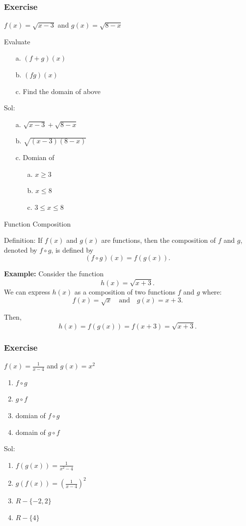 \documentclass{beamer}
\begin{document}
  \begin{frame}
    \frametitle{Exercise }
    \( f(x)  = \sqrt{x-3}\) and \(g(x) = \sqrt{8 - x }\)
    
    Evaluate
    \begin{enumerate}
      \item[a.] \((f+g)(x)\)  
      \item[b.]  \((fg)(x)\)
      \item[c.] Find the domain of above 
    \end{enumerate}
  \pause 
  Sol: 
  \begin{enumerate}
    \item[a.] \(\sqrt{x-3} + \sqrt{8-x} \) 
    \item[b.] \(\sqrt{(x-3)(8-x)} \)  
    \item[c.]  Domian of \begin{enumerate}
      \item[a.] \(x\geq 3 \)  
      \item[b.] \(x \leq 8 \)  
      \item[c.] \( 3 \leq x \leq 8 \)    
    \end{enumerate}
  \end{enumerate}
\end{frame}
  \begin{frame}{Function Composition }
    \begin{block}{Definition:}  
    If \( f(x) \) and \( g(x) \) are functions, then the composition of \( f \) and \( g \), denoted by \( f \circ g \), is defined by
    \[
      (f \circ g)(x) = f(g(x)).
    \]
    \end{block}
    \medskip
    
    \textbf{Example:}
    Consider the function
    \[
      h(x) = \sqrt{x+3}.
    \]
    We can express \( h(x) \) as a composition of two functions \( f \) and \( g \) where:
    \[
      f(x) = \sqrt{x} \quad \text{and} \quad g(x) = x+3.
    \]
    
    Then,
    \[
      h(x) = f(g(x)) = f(x+3) = \sqrt{x+3}.
    \]
  \end{frame}
\begin{frame}
  \frametitle{Exercise}
  \(
  f(x) = \frac{1}{x-4} 
  \) and \( g(x) = x^{2} \) 
  \begin{enumerate}
    \item \(f \circ g \)  
    \item \( g \circ f \)   
    \item domian of \(f \circ g \) 
    \item domain of \( g \circ f \) 
  \end{enumerate}
  Sol: \pause 
  \begin{enumerate}
    \item  \(f(g(x)) = \frac{1}{x^{2} - 4}\)
    \item \(g(f(x)) = (\frac{1}{x-4})^{2}\) 
    \item \(R - \{-2,2\} \)  
    \item \(R - \{4\} \)  
  \end{enumerate}
\end{frame}
\end{document}
